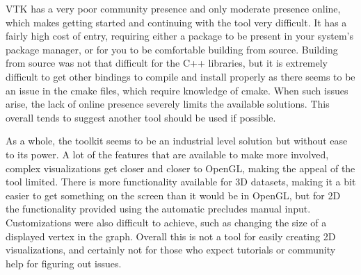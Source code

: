 \documentclass[12pt]{article}
\begin{document}
    VTK has a very poor community presence and only moderate presence online, which makes getting started and continuing with the tool very difficult.  It has a fairly high cost of entry, requiring either a package to be present in your system's package manager, or for you to be comfortable building from source.  Building from source was not that difficult for the C++ libraries, but it is extremely difficult to get other bindings to compile and install properly as there seems to be an issue in the cmake files, which require knowledge of cmake.  When such issues arise, the lack of online presence severely limits the available solutions.  This overall tends to suggest another tool should be used if possible.

    As a whole, the toolkit seems to be an industrial level solution but without ease to its power.  A lot of the features that are available to make more involved, complex visualizations get closer and closer to OpenGL, making the appeal of the tool limited.  There is more functionality available for 3D datasets, making it a bit easier to get something on the screen than it would be in OpenGL, but for 2D the functionality provided using the automatic precludes manual input.  Customizations were also difficult to achieve, such as changing the size of a displayed vertex in the graph.  Overall this is not a tool for easily creating 2D visualizations, and certainly not for those who expect tutorials or community help for figuring out issues.
\end{document}
